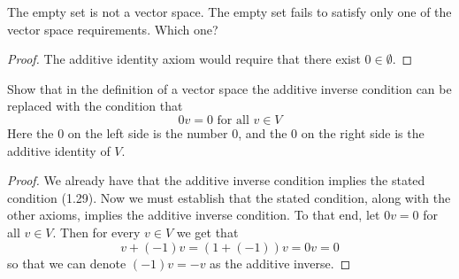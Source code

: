 \begin{exercise} \label{1.B.4}
    The empty set is not a vector space. The empty set fails to satisfy only one of the vector space requirements. Which one?
    
    \begin{proof}
        The additive identity axiom would require that there exist \( 0 \in \emptyset \).
    \end{proof}
\end{exercise}

\begin{exercise} \label{1.B.5}
    Show that in the definition of a vector space the additive inverse condition can be replaced with the condition that 
    \[ 0v=0 \text{ for all } v \in V \]
    Here the \( 0 \) on the left side is the number \( 0 \), and the \( 0 \) on the right side is the additive identity of \( V \).
    
    \begin{proof}
        We already have that the additive inverse condition implies the stated condition (1.29). Now we must establish that the stated condition, along with the other axioms, implies the additive inverse condition. To that end, let \( 0v = 0 \) for all \( v \in V \). Then for every \( v \in V \) we get that
        \[ v + (-1)v = (1+(-1))v = 0v =0 \]
        so that we can denote \( (-1)v = -v \) as the additive inverse.
    \end{proof}
\end{exercise}

